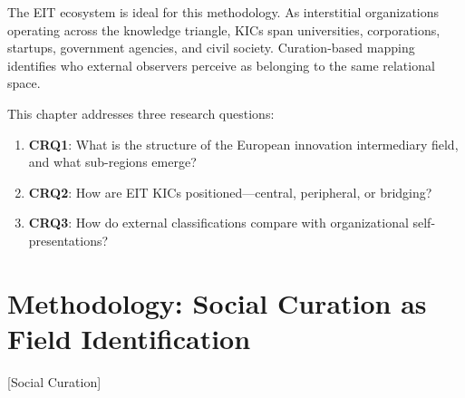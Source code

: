\documentclass[../main.tex]{subfiles}
\begin{document}
The EIT ecosystem is ideal for this methodology. As interstitial organizations operating across the knowledge triangle, KICs span universities, corporations, startups, government agencies, and civil society. Curation-based mapping identifies who external observers perceive as belonging to the same relational space.

This chapter addresses three research questions:

\begin{enumerate}
    \item \textbf{CRQ1}: What is the structure of the European innovation intermediary field, and what sub-regions emerge?
    \item \textbf{CRQ2}: How are EIT KICs positioned---central, peripheral, or bridging?
    \item \textbf{CRQ3}: How do external classifications compare with organizational self-presentations?
\end{enumerate}


\section{Methodology: Social Curation as Field Identification}[Social Curation]
\end{document}
